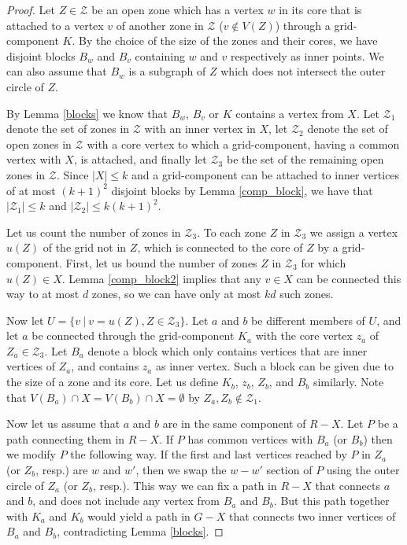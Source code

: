 \documentclass{llncs}
\begin{document}
\begin{proof}
Let $Z \in \mathcal{Z}$ be an open zone which has a vertex $w$ in its core that is attached to a vertex
$v$ of another zone in $\mathcal{Z}$ ($v \notin V(Z)$) through a grid-component $K$.
By the choice of the size of the zones and their cores, we have disjoint blocks $B_w$ and $B_v$
containing $w$ and $v$ respectively as inner points.
We can also assume that $B_w$ is a subgraph of $Z$
which does not intersect the outer circle of $Z$.

By Lemma \ref{blocks} we know that $B_w$, $B_v$ or $K$ contains a vertex from $X$.
Let $\mathcal{Z}_1$ denote the set of zones in $\mathcal{Z}$
with an inner vertex in $X$,
let $\mathcal{Z}_2$ denote the set of open zones in $\mathcal{Z}$ with a
core vertex to which a grid-component, having a common vertex with $X$, is attached,
and finally let $\mathcal{Z}_3$ be the set of the remaining open zones in $\mathcal{Z}$.
Since $|X| \leq k$ and a grid-component can be attached to inner vertices of at most
$(k+1)^2$  disjoint blocks by Lemma \ref{comp_block},
we have that $|\mathcal{Z}_1|\leq k$ and $|\mathcal{Z}_2|\leq k(k+1)^2$.

Let us count the number of zones in $\mathcal{Z}_3$.
To each zone $Z$ in $\mathcal{Z}_3$ we assign a vertex $u(Z)$ of the grid not in $Z$,
which is connected to the core of $Z$ by a grid-component.
First, let us bound the number of zones $Z$ in $\mathcal{Z}_3$ for which $u(Z) \in X$.
Lemma \ref{comp_block2} implies that any $v \in X$ can be connected this way to at most $d$ zones, so
we can have only at most $kd$ such zones.

Now let $U= \{ v \ | \ v=u(Z), Z \in \mathcal{Z}_3 \}$.
Let $a$ and $b$ be different members of $U$, and let $a$ be connected through the grid-component $K_a$
with the core vertex $z_a$ of $Z_a \in \mathcal{Z}_3$.
Let $B_a$ denote a block which only contains vertices that are inner vertices of $Z_a$,
and contains $z_a$ as inner vertex. Such a block can be given due to the size of a zone and its core.
Let us define $K_b$, $z_b$, $Z_b$, and $B_b$ similarly.
Note that $V(B_a) \cap X = V(B_b) \cap X= \emptyset$ by $Z_a,Z_b \notin \mathcal{Z}_1$.

Now let us assume that $a$ and $b$ are in the same component of $R-X$. Let $P$ be a path
connecting them in $R-X$. If $P$ has common vertices with $B_a$ (or $B_b$) then we modify $P$
the following way. If the first and last vertices reached by $P$ in $Z_a$ (or $Z_b$, resp.)
are $w$ and $w'$, then we swap the $w - w'$ section of $P$
using the outer circle of $Z_a$ (or $Z_b$, resp.).
This way we can fix a path in $R-X$ that connects $a$ and $b$, and does not include any vertex
from $B_a$ and $B_b$. But this path together with $K_a$ and $K_b$ would yield a path in $G-X$
that connects two inner vertices of $B_a$ and $B_b$, contradicting Lemma \ref{blocks}.


\end{proof}
\end{document}
